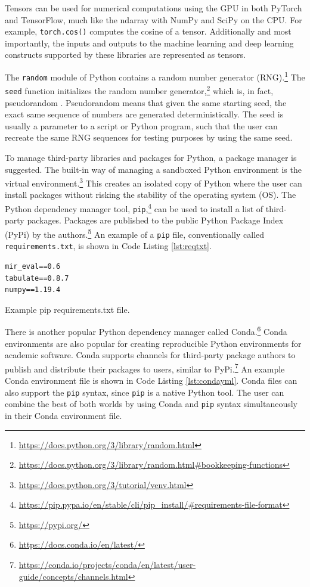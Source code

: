\documentclass[report.tex]{subfiles}
\begin{document}
Tensors can be used for numerical computations using the GPU in both PyTorch and TensorFlow, much like the ndarray with NumPy and SciPy on the CPU. For example, \Verb#torch.cos()# computes the cosine of a tensor. Additionally and most importantly, the inputs and outputs to the machine learning and deep learning constructs supported by these libraries are represented as tensors.

The \Verb#random# module of Python contains a random number generator (RNG).\footnote{\url{https://docs.python.org/3/library/random.html}} The \Verb#seed# function initializes the random number generator,\footnote{\url{https://docs.python.org/3/library/random.html\#bookkeeping-functions}} which is, in fact, pseudorandom \parencite{pseudorng}. Pseudorandom means that given the same starting seed, the exact same sequence of numbers are generated deterministically. The seed is usually a parameter to a script or Python program, such that the user can recreate the same RNG sequences for testing purposes by using the same seed.

To manage third-party libraries and packages for Python, a package manager is suggested. The built-in way of managing a sandboxed Python environment is the virtual environment.\footnote{\url{https://docs.python.org/3/tutorial/venv.html}} This creates an isolated copy of Python where the user can install packages without risking the stability of the operating system (OS). The Python dependency manager tool, \Verb#pip#,\footnote{\url{https://pip.pypa.io/en/stable/cli/pip_install/\#requirements-file-format}} can be used to install a list of third-party packages. Packages are published to the public Python Package Index (PyPi) by the authors.\footnote{\url{https://pypi.org/}} An example of a \Verb#pip# file, conventionally called \Verb#requirements.txt#, is shown in Code Listing \ref{lst:reqtxt}.

\begin{listing}[ht]
\centering
\begin{BVerbatim}
mir_eval==0.6
tabulate==0.8.7
numpy==1.19.4
\end{BVerbatim}
	\caption{Example pip requirements.txt file.}
	\label{lst:reqtxt}
\end{listing}

There is another popular Python dependency manager called Conda.\footnote{\url{https://docs.conda.io/en/latest/}} Conda environments are also popular for creating reproducible Python environments for academic software. Conda supports channels for third-party package authors to publish and distribute their packages to users, similar to PyPi.\footnote{\url{https://conda.io/projects/conda/en/latest/user-guide/concepts/channels.html}} An example Conda environment file is shown in Code Listing \ref{lst:condayml}. Conda files can also support the \Verb#pip# syntax, since \Verb#pip# is a native Python tool. The user can combine the best of both worlds by using Conda and \Verb#pip# syntax simultaneously in their Conda environment file.
\end{document}
